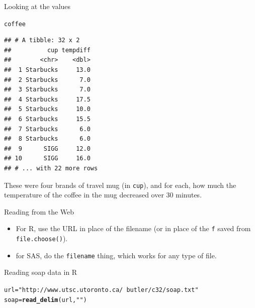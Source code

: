 \documentclass[unknownkeysallowed]{beamer}\usepackage[]{graphicx}\usepackage[]{color}
\makeatletter
\newcommand{\hlstr}[1]{\textcolor[rgb]{0.192,0.494,0.8}{#1}}%
\newcommand{\hlstd}[1]{\textcolor[rgb]{0.345,0.345,0.345}{#1}}%
\newcommand{\hlkwb}[1]{\textcolor[rgb]{0.69,0.353,0.396}{#1}}%
\newcommand{\hlkwd}[1]{\textcolor[rgb]{0.737,0.353,0.396}{\textbf{#1}}}%
\newenvironment{kframe}{%
 \def\at@end@of@kframe{}%
 \ifinner\ifhmode%
  \def\at@end@of@kframe{\end{minipage}}%
  \begin{minipage}{\columnwidth}%
 \fi\fi%
 \def\FrameCommand##1{\hskip\@totalleftmargin \hskip-\fboxsep
 \colorbox{shadecolor}{##1}\hskip-\fboxsep
     \hskip-\linewidth \hskip-\@totalleftmargin \hskip\columnwidth}%
 \MakeFramed {\advance\hsize-\width
   \@totalleftmargin\z@ \linewidth\hsize
   \@setminipage}}%
 {\par\unskip\endMakeFramed%
 \at@end@of@kframe}
\newenvironment{knitrout}{}{} %
\makeatother
\begin{document}
\begin{frame}[fragile]{Looking at the values}
  
\begin{knitrout}
\color{fgcolor}\begin{kframe}
\begin{alltt}
\hlstd{coffee}
\end{alltt}
\begin{verbatim}
## # A tibble: 32 x 2
##          cup tempdiff
##        <chr>    <dbl>
##  1 Starbucks     13.0
##  2 Starbucks      7.0
##  3 Starbucks      7.0
##  4 Starbucks     17.5
##  5 Starbucks     10.0
##  6 Starbucks     15.5
##  7 Starbucks      6.0
##  8 Starbucks      6.0
##  9      SIGG     12.0
## 10      SIGG     16.0
## # ... with 22 more rows
\end{verbatim}
\end{kframe}
\end{knitrout}

These were four brands of travel mug (in \texttt{cup}), and for each,
how much the temperature of the coffee in the mug decreased over 30
minutes. 
  
\end{frame}

\begin{frame}[fragile]{Reading from the Web}
  
  \begin{itemize}
  \item For R, use the URL in place of the filename (or in place of
    the \texttt{f} saved from \texttt{file.choose()}). 
  \item for SAS, do the \texttt{filename} thing, which works for any
    type of file.
  \end{itemize}
  
\end{frame}

\begin{frame}[fragile]{Reading soap data in R}
  
\begin{knitrout}
\color{fgcolor}\begin{kframe}
\begin{alltt}
\hlstd{url}\hlkwb{=}\hlstr{"http://www.utsc.utoronto.ca/~butler/c32/soap.txt"}
\hlstd{soap}\hlkwb{=}\hlkwd{read_delim}\hlstd{(url,}\hlstr{" "}\hlstd{)}
\end{alltt}


{\ttfamily\noindent\itshape\color{messagecolor}{\#\# Parsed with column specification:\\\#\# cols(\\\#\#\ \  case = col\_integer(),\\\#\#\ \  scrap = col\_integer(),\\\#\#\ \  speed = col\_integer(),\\\#\#\ \  line = col\_character()\\\#\# )}}\end{kframe}
\end{knitrout}
  
\end{frame}
\end{document}
